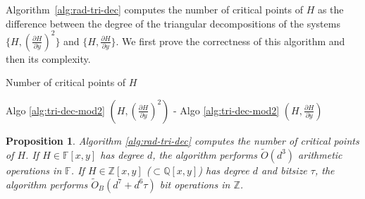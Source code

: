 \documentclass{sig-alternate}
\newtheorem{proposition}[theorem]{Proposition}
\newcommand{\sO}{\ensuremath{\widetilde{{O}}}}
\newcommand{\sOB}{\ensuremath{\widetilde{{O}}_B}}
\begin{document}
\quad
Algorithm~\ref{alg:rad-tri-dec} computes the number of critical points of $H$  as the difference between the
degree of the triangular decompositions of the systems $\{H,(\frac{\partial H}{\partial y})^2\}$ and $\{H,\frac{\partial
  H}{\partial y}\}$. We first prove the correctness of this algorithm and then its complexity. 

\begin{algorithm}[t]
  \caption{Number of critical points of $H$}
\label{alg:rad-tri-dec}
\begin{algorithmic}[1]

\smallskip
\RETURN  Algo \ref{alg:tri-dec-mod2} $(H,(\frac{\partial H}{\partial y})^2)$ - Algo \ref{alg:tri-dec-mod2} $(H,\frac{\partial H}{\partial y})$ 


\end{algorithmic}
\end{algorithm}




\begin{proposition}\label{prop:proof-correctness}
  Algorithm \ref{alg:rad-tri-dec} computes the number of critical points of $H$.
If $H\in\mathbb{F}[x,y]$ has degree $d$, the algorithm performs $\sO(d^3)$ arithmetic
operations in $\mathbb{F}$. If 
$H\in\mathbb{Z}[x,y]$ ($\subset\mathbb{Q}[x,y]$) has degree $d$ and bitsize $\tau$,
the algorithm performs $\sOB(d^7+d^6\tau)$ bit 
operations in $\mathbb{Z}$. 

\end{proposition}
\end{document}
